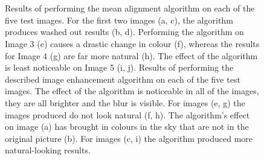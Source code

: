 \documentclass[journal,transmag]{IEEEtran}
\begin{document}
\begin{figure}[t]
{	}
	 \\
	 \\
\caption{Results of performing the mean alignment algorithm on each of the five test images.  For the first two images (a, c), the algorithm produces washed out results (b, d).  Performing the algorithm on Image 3 (e) causes a drastic change in colour (f), whereas the results for Image 4 (g) are far more natural (h).  The effect of the algorithm is least noticeable on Image 5 (i, j). 
	Results of performing the described image enhancement algorithm on each of the five test images. The effect of the algorithm is noticeable in all of the images, they are all brighter and the blur is visible. For images (e, g) the images produced do not look natural (f, h). The algorithm's effect on image (a) has brought in colours in the sky that are not in the original picture (b). For images (c, i) the algorithm produced more natural-looking results. }
\label{fig:results}
\end{figure}
\end{document}
